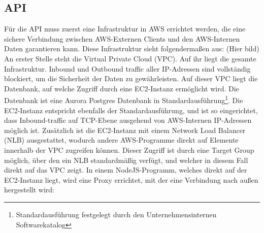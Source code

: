 \subsection{API}
Für die API muss zuerst eine Infrastruktur in AWS errichtet werden, die eine sichere Verbindung zwischen AWS-Externen Clients und den AWS-Internen
Daten garantieren kann. Diese Infrastruktur sieht folgendermaßen aus:
(Hier bild)
An erster Stelle steht die Virtual Private Cloud (VPC). Auf ihr liegt die gesamte Infrastruktur. Inbound und Outbound traffic aller IP-Adressen sind vollständig
blockiert, um die Sicherheit der Daten zu gewährleisten. Auf dieser VPC liegt die Datenbank, auf welche Zugriff durch eine EC2-Instanz ermöglicht wird. 
Die Datenbank ist eine Aurora Postgres Datenbank in Standardausführung\footnote{Standardausführung festgelegt durch den Unternehmensinternen Softwarekatalog}. Die EC2-Instanz
entspricht ebenfalls der Standardausführung, und ist so eingerichtet, dass Inbound-traffic auf TCP-Ebene ausgehend von AWS-Internen IP-Adressen möglich ist.
Zusätzlich ist die EC2-Instanz mit einem Network Load Balancer (NLB) ausgestattet, wodurch andere AWS-Programme direkt auf Elemente innerhalb der VPC zugreifen können. Dieser Zugriff ist
durch eine Target Group möglich, über den ein NLB standardmäßig verfügt, und welcher in diesem Fall direkt auf das VPC zeigt. 
In einem NodeJS-Programm, welches direkt auf der EC2-Instanz liegt, wird eine Proxy errichtet, mit der eine Verbindung nach außen hergestellt wird:
